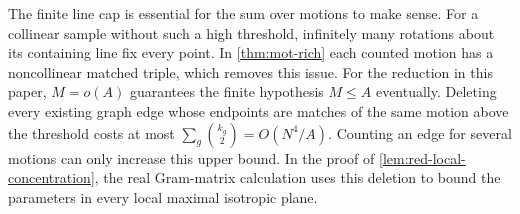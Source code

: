 \begin{remark}
\label{rem:mot-scope}
The finite line cap is essential for the sum over motions to make sense.  For a collinear sample without such a high threshold, infinitely many rotations about its containing line fix every point.  In \cref{thm:mot-rich} each counted motion has a noncollinear matched triple, which removes this issue. For the reduction in this paper, $M=o(A)$ guarantees the finite hypothesis $M\le A$ eventually.  Deleting every existing graph edge whose endpoints are matches of the same motion above the threshold costs at most $\sum_g\binom{k_g}{2}=O(N^4/A)$.  Counting an edge for several motions can only increase this upper bound.  In the proof of \cref{lem:red-local-concentration}, the real Gram-matrix calculation uses this deletion to bound the parameters in every local maximal isotropic plane.
\end{remark}
